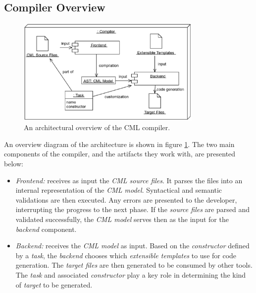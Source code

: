 \subsection{Compiler Overview}\label{subsec:overview}

\begin{figure}
\centering
\includegraphics[width=0.8\textwidth]{compiler/figure-overview}
\caption{An architectural overview of the CML compiler.}
\label{fig:overview}
\end{figure}

An overview diagram of the architecture is shown in figure \ref{fig:overview}.
The two main components of the compiler,
and the artifacts they work with,
are presented below:

\begin{itemize}

\item \emph{Frontend:} receives as input the \emph{CML source files}.
It parses the files into an internal representation of the \emph{CML model}.
Syntactical and semantic validations are then executed.
Any errors are presented to the developer, interrupting the progress to the next phase.
If the \emph{source files} are parsed and validated successfully,
the \emph{CML model} serves then as the input for the \emph{backend} component.

\item \emph{Backend:} receives the \emph{CML model} as input.
Based on the \emph{constructor} defined by a \emph{task},
the \emph{backend} chooses which \emph{extensible templates} to use for code generation.
The \emph{target files} are then generated to be consumed by other tools.
The \emph{task} and associated \emph{constructor} play a key role
in determining the kind of \emph{target} to be generated.

\end{itemize}
